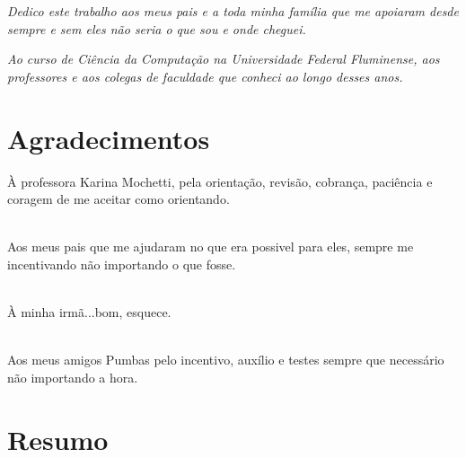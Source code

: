 \documentclass[a4paper, 12pt, oneside]{book}
\begin{document}
\newpage


\newpage


\begin{flushright}
\begin{minipage}{0.5\textwidth}

\vspace{15.0cm}

\emph{
Dedico este trabalho aos meus pais e a toda minha família que me apoiaram desde sempre e sem eles não seria o que sou e onde cheguei.
}

\emph{Ao curso de Ciência da Computação na Universidade Federal Fluminense, aos professores e aos colegas de faculdade que conheci ao longo desses anos.}

\end{minipage}
\end{flushright}


\chapter*{Agradecimentos}

\thispagestyle{myheadings}

\noindent

À professora Karina Mochetti, pela orientação, revisão, cobrança, paciência e coragem de me aceitar como orientando.

\ \\ 

Aos meus pais que me ajudaram no que era possivel para eles, sempre me incentivando não importando o que fosse.

\ \\ 

À minha irmã...bom, esquece.

\ \\ 

Aos meus amigos Pumbas pelo incentivo, auxílio e testes sempre que necessário não importando a hora.


\chapter*{Resumo}
\end{document}

